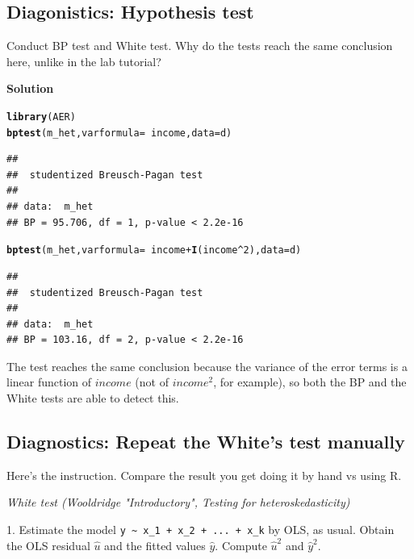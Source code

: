 \documentclass{article}\usepackage[]{graphicx}\usepackage[]{color}
\makeatletter
\newcommand{\hlnum}[1]{\textcolor[rgb]{0.686,0.059,0.569}{#1}}%
\newcommand{\hlopt}[1]{\textcolor[rgb]{0,0,0}{#1}}%
\newcommand{\hlstd}[1]{\textcolor[rgb]{0.345,0.345,0.345}{#1}}%
\newcommand{\hlkwc}[1]{\textcolor[rgb]{0.333,0.667,0.333}{#1}}%
\newcommand{\hlkwd}[1]{\textcolor[rgb]{0.737,0.353,0.396}{\textbf{#1}}}%
\newenvironment{kframe}{%
 \def\at@end@of@kframe{}%
 \ifinner\ifhmode%
  \def\at@end@of@kframe{\end{minipage}}%
  \begin{minipage}{\columnwidth}%
 \fi\fi%
 \def\FrameCommand##1{\hskip\@totalleftmargin \hskip-\fboxsep
 \colorbox{shadecolor}{##1}\hskip-\fboxsep
     \hskip-\linewidth \hskip-\@totalleftmargin \hskip\columnwidth}%
 \MakeFramed {\advance\hsize-\width
   \@totalleftmargin\z@ \linewidth\hsize
   \@setminipage}}%
 {\par\unskip\endMakeFramed%
 \at@end@of@kframe}
\newenvironment{knitrout}{}{} %
\makeatother
\begin{document}
\subsection{Diagonistics: Hypothesis test}

Conduct BP test and White test. Why do the tests reach the same conclusion here, unlike in the lab tutorial?

\textbf{Solution}

\begin{knitrout}
\color{fgcolor}\begin{kframe}
\begin{alltt}
\hlkwd{library}\hlstd{(AER)}
\hlkwd{bptest}\hlstd{(m_het,} \hlkwc{varformula} \hlstd{=} \hlopt{~} \hlstd{income,} \hlkwc{data} \hlstd{= d)}
\end{alltt}
\begin{verbatim}
## 
## 	studentized Breusch-Pagan test
## 
## data:  m_het
## BP = 95.706, df = 1, p-value < 2.2e-16
\end{verbatim}
\begin{alltt}
\hlkwd{bptest}\hlstd{(m_het,} \hlkwc{varformula} \hlstd{=} \hlopt{~} \hlstd{income} \hlopt{+} \hlkwd{I}\hlstd{(income}\hlopt{^}\hlnum{2}\hlstd{),} \hlkwc{data} \hlstd{= d)}
\end{alltt}
\begin{verbatim}
## 
## 	studentized Breusch-Pagan test
## 
## data:  m_het
## BP = 103.16, df = 2, p-value < 2.2e-16
\end{verbatim}
\end{kframe}
\end{knitrout}

The test reaches the same conclusion because the variance of the error terms is a linear function of $income$ (not of $income^2$, for example), so both the BP and the White tests are able to detect this.

\subsection{Diagnostics: Repeat the White's test manually}

Here's the instruction. Compare the result you get doing it by hand vs using R.

\textit{White test (Wooldridge "Introductory", Testing for heteroskedasticity)}

1. Estimate the model \verb`y ~ x_1 + x_2 + ... + x_k` by OLS, as usual. Obtain the OLS residual $\hat u$ and the fitted values $\hat y$. Compute $\hat u^2$ and $\hat y^2$.
\end{document}

